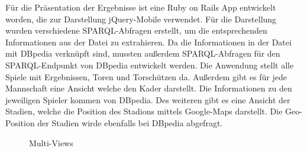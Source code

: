 \documentclass[runningheads,a4paper]{llncs}
\begin{document}
Für die Präsentation der Ergebnisse ist eine Ruby on Rails App entwickelt worden, die zur Darstellung jQuery-Mobile verwendet. Für die Darstellung wurden verschiedene SPARQL-Abfragen erstellt, um die entsprechenden Informationen aus der Datei zu extrahieren. Da die Informationen in der Datei mit DBpedia verknüpft sind, mussten außerdem SPARQL-Abfragen für den SPARQL-Endpunkt von DBpedia entwickelt werden. Die Anwendung stellt alle Spiele mit Ergebnissen, Toren und Torschützen da. Außerdem gibt es für jede Mannschaft eine Ansicht welche den Kader darstellt. Die Informationen zu den jeweiligen Spieler kommen von DBpedia. Des weiteren gibt es eine Ansicht der Stadien, welche die Position des Stadions mittels Google-Maps darstellt. Die Geo-Position der Stadien wirde ebenfalls bei DBpedia abgefragt.

\begin{figure}
\centering
{} 
\caption{Multi-Views}
\label{fig:screenshots}
\end{figure}
\end{document}
